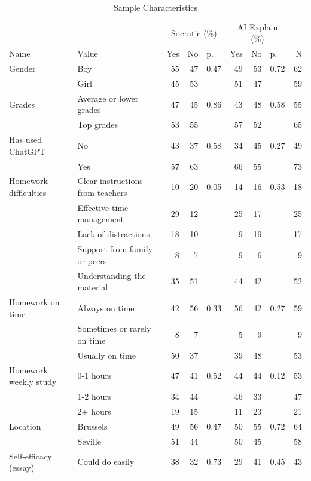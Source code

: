 \documentclass[
  12pt,
]{article}
\begin{document}
\begin{table}
\centering
\caption{\label{tab:summary-statistics}Sample Characteristics}
\centering
\begin{tabular}[t]{llrrlrrlr}
\toprule
\multicolumn{2}{c}{ } & \multicolumn{3}{c}{Socratic (\%)} & \multicolumn{3}{c}{AI Explain (\%)} & \multicolumn{1}{c}{ } \\
\cmidrule(l{3pt}r{3pt}){3-5} \cmidrule(l{3pt}r{3pt}){6-8}
Name & Value & Yes & No & p. & Yes & No & p. & N\\
\midrule\arrayrulecolor{gray!20}
Gender & Boy & 55 & 47 & 0.47 & 49 & 53 & 0.72 & 62\\
\hline
 & Girl & 45 & 53 &  & 51 & 47 &  & 59\\
\hline
Grades & Average or lower grades & 47 & 45 & 0.86 & 43 & 48 & 0.58 & 55\\
\hline
 & Top grades & 53 & 55 &  & 57 & 52 &  & 65\\
\hline
Has used ChatGPT & No & 43 & 37 & 0.58 & 34 & 45 & 0.27 & 49\\
\hline
 & Yes & 57 & 63 &  & 66 & 55 &  & 73\\
\hline
Homework difficulties & Clear instructions from teachers & 10 & 20 & 0.05 & 14 & 16 & 0.53 & 18\\
\hline
 & Effective time management & 29 & 12 &  & 25 & 17 &  & 25\\
\hline
 & Lack of distractions & 18 & 10 &  & 9 & 19 &  & 17\\
\hline
 & Support from family or peers & 8 & 7 &  & 9 & 6 &  & 9\\
\hline
 & Understanding the material & 35 & 51 &  & 44 & 42 &  & 52\\
\hline
Homework on time & Always on time & 42 & 56 & 0.33 & 56 & 42 & 0.27 & 59\\
\hline
 & Sometimes or rarely on time & 8 & 7 &  & 5 & 9 &  & 9\\
\hline
 & Usually on time & 50 & 37 &  & 39 & 48 &  & 53\\
\hline
Homework weekly study & 0-1 hours & 47 & 41 & 0.52 & 44 & 44 & 0.12 & 53\\
\hline
 & 1-2 hours & 34 & 44 &  & 46 & 33 &  & 47\\
\hline
 & 2+ hours & 19 & 15 &  & 11 & 23 &  & 21\\
\hline
Location & Brussels & 49 & 56 & 0.47 & 50 & 55 & 0.72 & 64\\
\hline
 & Seville & 51 & 44 &  & 50 & 45 &  & 58\\
\hline
Self-efficacy (essay) & Could do easily & 38 & 32 & 0.73 & 29 & 41 & 0.45 & 43\\

\end{tabular}
\end{table}
\end{document}
